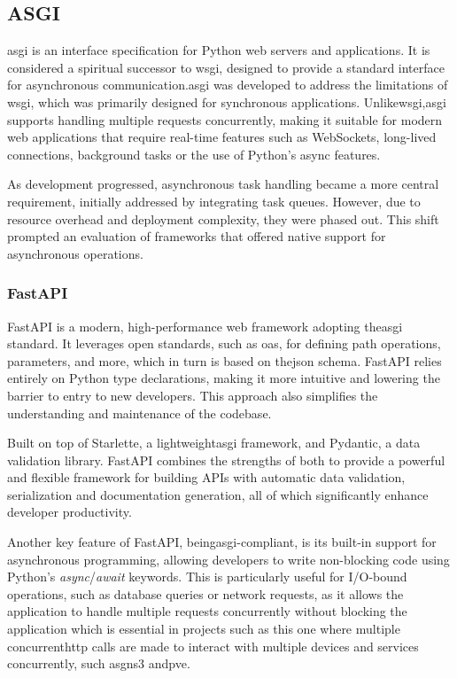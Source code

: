   \subsection{ASGI}

    \ac{asgi} is an interface specification for Python web servers and applications. It is considered a spiritual successor to
    \ac{wsgi}, designed to provide a standard interface for asynchronous communication.\ac{asgi} was developed to address the 
    limitations of \ac{wsgi}, which was primarily designed for synchronous applications. Unlike\ac{wsgi},\ac{asgi} supports 
    handling multiple requests concurrently, making it suitable for modern web applications that require real-time features such 
    as WebSockets, long-lived connections, background tasks or the use of Python's async features.
    
    As development progressed, asynchronous task handling became a more central requirement, initially addressed by integrating 
    task queues. However, due to resource overhead and deployment complexity, they were phased out. This shift prompted an evaluation 
    of frameworks that offered native support for asynchronous operations.
    
    \subsubsection{FastAPI}
      
      FastAPI is a modern, high-performance web framework adopting the\ac{asgi} standard. It leverages open standards, such as 
      \ac{oas}, for defining path operations, parameters, and more, which in turn is based on the\ac{json} schema.
      FastAPI relies entirely on Python type declarations, making it more intuitive and lowering the barrier to entry to new 
      developers. This approach also simplifies the understanding and maintenance of the codebase.
      
      Built on top of Starlette, a lightweight\ac{asgi} framework, and Pydantic, a data validation library. FastAPI combines the 
      strengths of both to provide a powerful and flexible framework for building APIs with automatic data validation, 
      serialization and documentation generation, all of which significantly enhance developer productivity.
      
      Another key feature of FastAPI, being\ac{asgi}-compliant, is its built-in support for asynchronous programming, allowing 
      developers to write non-blocking code using Python's \textit{async}/\textit{await} keywords. This is particularly useful 
      for I/O-bound operations, such as database queries or network requests, as it allows the application to handle multiple 
      requests concurrently without blocking the application which is essential in projects such as this one where multiple 
      concurrent\ac{http} calls are made to interact with multiple devices and services concurrently, such as\ac{gns3} and\ac{pve}.
      
